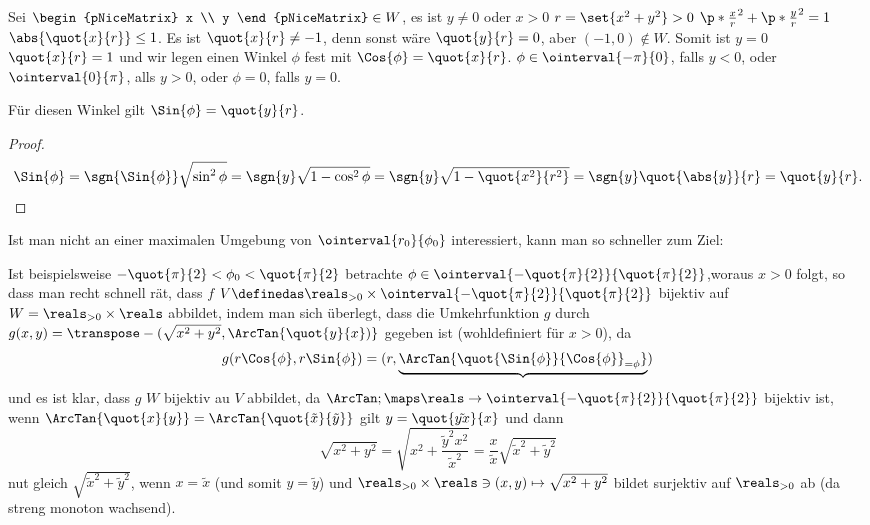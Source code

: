 \begin{beispiele}
\begin{enumerate}
\begin{beachte*}
       Sei \( \begin{pNiceMatrix} x \\ y \end{pNiceMatrix} \in W \), \dh es ist \( y\neq 0 \) oder \( x>0 \) \timplies \( r=\set{x^2+y^2}>0 \) \timplies \( \p*{ \frac{x}{r} }^2+\p*{ \frac{y}{r} }^2=1 \) \timplies \( \abs{\quot{x}{r}}\leq 1 \). Es ist \( \quot{x}{r}\neq -1 \), denn sonst wäre \( \quot{y}{r}=0 \), aber \( (-1,0)\notin W \). Somit ist \( y=0 \) \tiff \( \quot{x}{r}=1 \) und wir legen einen Winkel \( \phi \) fest mit \( \Cos{\phi}=\quot{x}{r} \). \( \phi\in \ointerval{-\pi
        }{0} \), falls \( y<0 \), oder \( \ointerval{0}{\pi} \), alls \( y>0 \), oder \( \phi=0 \), falls \( y=0. \)

      \begin{behauptung*}
        Für diesen Winkel gilt \( \Sin{\phi}=\quot{y}{r} \).
      \end{behauptung*}
      \begin{proof}
        \begin{equation*}
          \Sin{\phi}=\sgn{\Sin{\phi}}\sqrt{\sin^2 \phi}=\sgn{y}\sqrt{1-\cos^2 \phi}=\sgn{y}\sqrt{1-\quot{x^2}{r^2}}=\sgn{y}\quot{\abs{y}}{r}=\quot{y}{r}.
        \end{equation*}
      \end{proof}
      Ist man nicht an einer maximalen Umgebung von \( \ointerval{r_0}{\phi_0}  \) interessiert, kann man so schneller zum Ziel:

      Ist beispielsweise \( -\quot{\pi}{2}<\phi_0<\quot{\pi}{2} \) betrachte \( \phi\in \ointerval{-\quot{\pi}{2}}{\quot{\pi}{2}} \),woraus \( x>0 \) folgt, so dass man recht schnell rät, dass \( f \) \( V\definedas \reals_{>0}\times  \ointerval{-\quot{\pi}{2}}{\quot{\pi}{2}} \) bijektiv auf \( W=\reals_{>0}\times \reals \) abbildet, indem man sich überlegt, dass die Umkehrfunktion \( g \) durch \( g(x,y)=\transpose-{(\sqrt{x^2+y^2}, \ArcTan{\quot{y}{x})}} \) gegeben ist (wohldefiniert für \( x>0 \)), da 
      \begin{equation*}
        g(r \Cos{\phi}, r\Sin{\phi})=(r,\underbrace{\ArcTan{\quot{\Sin{\phi}}{\Cos{\phi}}_{=\phi}}})
      \end{equation*}
      und es ist klar, dass \( g \) \( W \) bijektiv au \( V \) abbildet, da \( \ArcTan;\maps \reals\to \ointerval{-\quot{\pi}{2}}{\quot{\pi}{2}} \) bijektiv ist, \sd  wenn \( \ArcTan{\quot{x}{y}}=\ArcTan{\quot{\tilde{x}}{\tilde{y}}} \) gilt \( y=\quot{\tilde{yx}}{x} \) und dann
      \begin{equation*}
        \sqrt{x^2+y^2}=\sqrt{x^2+\frac{\tilde{y}^2 x^2}{\tilde{x}^2}}=\frac{x}{\tilde{x}}\sqrt{\tilde{x}^2+\tilde{y}^2}
      \end{equation*}
      nut gleich \( \sqrt{\tilde{x}^2+\tilde{y}^2} \), wenn \( x=\tilde{x} \) (und somit \( y= \tilde{y}\)) und \( \reals_{>0}\times\reals\ni (x,y)\mapsto \sqrt{x^2+y^2} \) bildet surjektiv auf \( \reals_{>0} \) ab (da streng monoton wachsend).
    \end{beachte*}
  \end{enumerate}
\end{beispiele}
